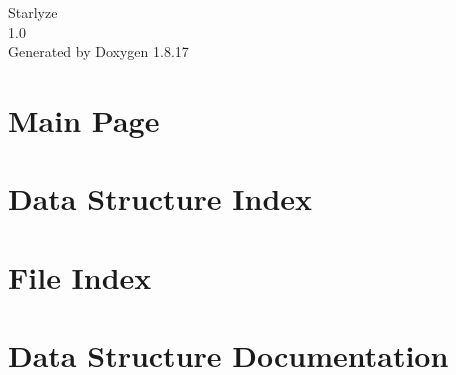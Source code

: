 \let\mypdfximage\pdfximage\def\pdfximage{\immediate\mypdfximage}\documentclass[twoside]{book}
\newcommand{\+}{\discretionary{\mbox{\scriptsize$\hookleftarrow$}}{}{}}
\newcommand{\clearemptydoublepage}{%
  \newpage{\pagestyle{empty}\cleardoublepage}%
}
\begin{document}
\hypersetup{pageanchor=false,
             bookmarksnumbered=true,
             pdfencoding=unicode
            }
\begin{titlepage}
\vspace*{7cm}
\begin{center}%
{\Large Starlyze \\[1ex]\large 1.\+0 }\\
\vspace*{1cm}
{\large Generated by Doxygen 1.8.17}\\
\end{center}
\end{titlepage}
\clearemptydoublepage
{}
\tableofcontents
\clearemptydoublepage
{}
\hypersetup{pageanchor=true}

\chapter{Main Page}
\label{index}\hypertarget{index}{}
\chapter{Data Structure Index}

\chapter{File Index}

\chapter{Data Structure Documentation}







































\end{document}
